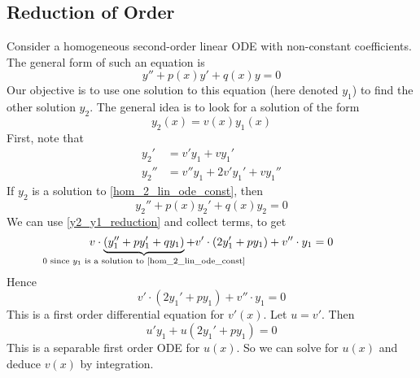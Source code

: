 \subsection{Reduction of Order}
Consider a homogeneous second-order linear ODE with non-constant coefficients.
The general form of such an equation is
\begin{equation}\label{hom_2_lin_ode_const}
	y'' + p(x) y' + q(x) y = 0
\end{equation}
Our objective is to use one solution to this equation (here denoted \(y_1\)) to find the other solution \(y_2\).
The general idea is to look for a solution of the form
\begin{equation}\label{y2_y1_reduction}
	y_2(x) = v(x)y_1(x)
\end{equation}
First, note that
\begin{align*}
	y_2'  & = v'y_1 + vy_1'             \\
	y_2'' & = v''y_1 + 2v'y_1' + vy_1''
\end{align*}
If \(y_2\) is a solution to \eqref{hom_2_lin_ode_const}, then
\[
	y_2'' + p(x) y_2' + q(x) y_2 = 0
\]
We can use \eqref{y2_y1_reduction} and collect terms, to get
\[
	v\cdot\underbrace{(y_1'' + py_1' + qy_1)}_{\mathclap{\text{0 since \(y_1\) is a solution to \eqref{hom_2_lin_ode_const}}}} + v'\cdot(2y_1' + py_1) + v''\cdot y_1 = 0
\]
Hence
\[
	v'\cdot (2y_1' + py_1) + v'' \cdot y_1 = 0
\]
This is a first order differential equation for \(v'(x)\).
Let \(u=v'\).
Then
\[
	u'y_1 + u (2y_1' + py_1) = 0
\]
This is a separable first order ODE for \(u(x)\).
So we can solve for \(u(x)\) and deduce \(v(x)\) by integration.

